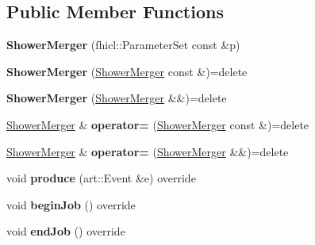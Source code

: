 \subsection*{Public Member Functions}
\begin{DoxyCompactItemize}
\item 
\hypertarget{classShowerMerger_a50fc7d6db9b3f84bba1d7e7e68f1374e}{{\bfseries Shower\-Merger} (fhicl\-::\-Parameter\-Set const \&p)}\label{classShowerMerger_a50fc7d6db9b3f84bba1d7e7e68f1374e}

\item 
\hypertarget{classShowerMerger_a2b781d7856276bf348a49fd0a06cb24f}{{\bfseries Shower\-Merger} (\hyperlink{classShowerMerger}{Shower\-Merger} const \&)=delete}\label{classShowerMerger_a2b781d7856276bf348a49fd0a06cb24f}

\item 
\hypertarget{classShowerMerger_a080dc5947c74294bf05cb5df45743571}{{\bfseries Shower\-Merger} (\hyperlink{classShowerMerger}{Shower\-Merger} \&\&)=delete}\label{classShowerMerger_a080dc5947c74294bf05cb5df45743571}

\item 
\hypertarget{classShowerMerger_aa2a1c38ecced6bf3708cf075cc871b07}{\hyperlink{classShowerMerger}{Shower\-Merger} \& {\bfseries operator=} (\hyperlink{classShowerMerger}{Shower\-Merger} const \&)=delete}\label{classShowerMerger_aa2a1c38ecced6bf3708cf075cc871b07}

\item 
\hypertarget{classShowerMerger_a93a9e5d5251f530287fdd39f77584bf2}{\hyperlink{classShowerMerger}{Shower\-Merger} \& {\bfseries operator=} (\hyperlink{classShowerMerger}{Shower\-Merger} \&\&)=delete}\label{classShowerMerger_a93a9e5d5251f530287fdd39f77584bf2}

\item 
\hypertarget{classShowerMerger_ab7251dd56c36d4d8ba07437af0b33bb9}{void {\bfseries produce} (art\-::\-Event \&e) override}\label{classShowerMerger_ab7251dd56c36d4d8ba07437af0b33bb9}

\item 
\hypertarget{classShowerMerger_a042daf0f57e3c5c0c08dc9274f98b63e}{void {\bfseries begin\-Job} () override}\label{classShowerMerger_a042daf0f57e3c5c0c08dc9274f98b63e}

\item 
\hypertarget{classShowerMerger_a37852496f6771e29b167cd09c6c65cd0}{void {\bfseries end\-Job} () override}\label{classShowerMerger_a37852496f6771e29b167cd09c6c65cd0}

\end{DoxyCompactItemize}
